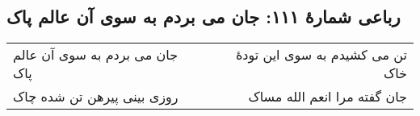 \begin{center}
\section*{رباعی شمارهٔ ۱۱۱: جان می بردم به سوی آن عالم پاک}
\label{sec:111}
\begin{longtable}{l p{0.5cm} r}
جان می بردم به سوی آن عالم پاک
&&
تن می کشیدم به سوی این تودهٔ خاک
\\
روزی بینی پیرهن تن شده چاک
&&
جان گفته مرا انعم الله مساک
\\
\end{longtable}
\end{center}
